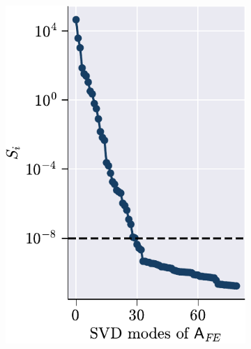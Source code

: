 \documentclass[11pt]{article}
\begin{document}
            \begin{figure}[t!]
                \centering
                \begin{subfigure}[b]{0.33\linewidth}
                    \centering
                    \includegraphics[height=1.3\linewidth]{S_AFE.pdf}
                    \caption{}
                    \label{fig:svd_AE}
                \end{subfigure}\hfill
                \begin{subfigure}[b]{0.33\linewidth}
                    \centering

\end{subfigure}
\end{figure}
\end{document}
